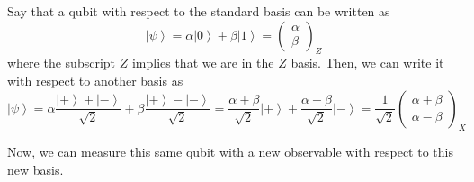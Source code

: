 \documentclass{article}
\newcommand{\ket}[1]{\ensuremath{\left|#1\right\rangle}}
\begin{document}
    \begin{example} 
      Say that a qubit with respect to the standard basis can be written as 
      \begin{equation}
        \ket{\psi} = \alpha \ket{0} + \beta \ket{1} = \begin{pmatrix} \alpha \\ \beta \end{pmatrix}_Z 
      \end{equation}
      where the subscript $Z$ implies that we are in the $Z$ basis. Then, we can write it with respect to another basis as 
      \begin{equation}
        \ket{\psi} = \alpha \frac{\ket{+} + \ket{-}}{\sqrt{2}} + \beta \frac{\ket{+} - \ket{-}}{\sqrt{2}} = \frac{\alpha + \beta}{\sqrt{2}} \ket{+} + \frac{\alpha - \beta}{\sqrt{2}} \ket{-} = \frac{1}{\sqrt{2}} \begin{pmatrix} \alpha + \beta \\ \alpha - \beta \end{pmatrix}_X
      \end{equation}
    \end{example}

    Now, we can measure this same qubit with a new observable with respect to this new basis. 
\end{document}
